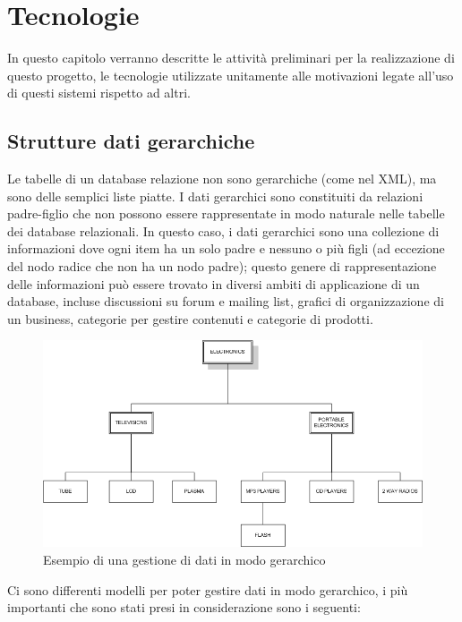 \chapter{Tecnologie}
In questo capitolo verranno descritte le attività preliminari per la realizzazione di questo progetto, le tecnologie utilizzate
unitamente alle motivazioni legate all'uso di questi sistemi rispetto ad altri.

\section{Strutture dati gerarchiche}
Le tabelle di un database relazione non sono gerarchiche (come nel XML), ma sono delle semplici liste piatte. I dati gerarchici sono 
constituiti da relazioni padre-figlio che non possono essere rappresentate in modo naturale nelle tabelle dei database relazionali.
In questo caso, i dati gerarchici sono una collezione di informazioni dove ogni item ha un solo padre e nessuno o più figli
(ad eccezione del nodo radice che non ha un nodo padre); questo genere di rappresentazione delle informazioni può essere trovato in 
diversi ambiti di applicazione di un database, incluse discussioni su forum e mailing list, grafici di organizzazione di un business, 
categorie per gestire contenuti e categorie di prodotti. 

\begin{figure}[H]
	\label{fig:Hde}
	\includegraphics[scale=0.5]{images/Hierarchical_Data_ex.PNG}
	\caption{Esempio di una gestione di dati in modo gerarchico}
\end{figure}

Ci sono differenti modelli per poter gestire dati in modo gerarchico, i più importanti che sono stati presi in considerazione sono i 
seguenti:

\newpage

